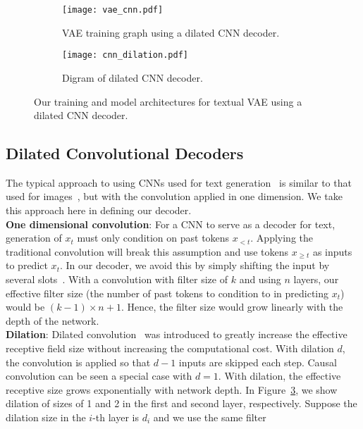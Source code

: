\documentclass{article}
\begin{document}
\begin{figure}[!t]
  \centering
  \begin{subfigure}[t]{0.8\linewidth}
    \texttt{[image: vae\_cnn.pdf]}
      \caption{VAE training graph using a dilated CNN decoder.}
      \label{fig:vae}
  \end{subfigure}
  \begin{subfigure}[t]{0.8\linewidth}
      \centering
      \texttt{[image: cnn\_dilation.pdf]}
      \caption{Digram of dilated CNN decoder.}
      \label{fig:cnn}
  \end{subfigure}
  \caption{Our training and model architectures for textual VAE using a dilated CNN decoder.}
\end{figure}

\subsection{Dilated Convolutional Decoders \label{cnn_sec}}
The typical approach to using CNNs used for text generation~\cite{kalchbrenner2016neural} is
similar to that used for images~\cite{krizhevsky2012imagenet,he2016deep},
but with the convolution applied in one dimension. We take this approach here in defining our decoder.
\\[0.2cm]
{\bf One dimensional convolution}: For a CNN to serve as a decoder for text, generation of $x_{t}$ must only condition on past tokens $x_{<t}$. Applying the
traditional convolution will break this assumption and use tokens $x_{\geq t}$ as inputs to predict
$x_{t}$. In our decoder, we avoid this by simply shifting the input by several slots~\cite{van2016conditional}. With a convolution with filter size of $k$ and using $n$ layers,
our effective filter size (the number of past tokens to condition to in
predicting $x_t$) would be $(k-1)\times n + 1$. Hence, the filter size would grow linearly with the depth of the network.
\\[0.2cm]
{\bf Dilation}: Dilated convolution~\cite{yu2015multi} was introduced to greatly increase the
effective receptive field size without increasing the computational cost. With
dilation $d$, the convolution is applied so that $d-1$ inputs are skipped each step.
Causal convolution can be seen a special case with $d=1$. With dilation, the effective
receptive size grows exponentially with network depth. In
Figure~\ref{fig:cnn}, we show dilation of sizes of 1 and 2 in the first and second layer, respectively. Suppose the dilation size in the $i$-th layer is $d_{i}$ and we use the same filter
\end{document}
